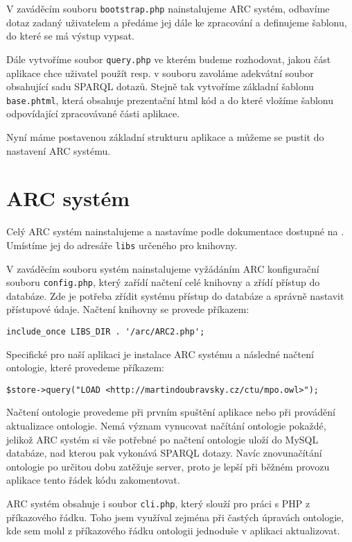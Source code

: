 V zaváděcím souboru \verb|bootstrap.php| nainstalujeme ARC systém, odbavíme dotaz zadaný uživatelem a předáme jej dále ke zpracování a definujeme šablonu, do které se má výstup vypsat.

Dále vytvoříme soubor \verb|query.php| ve kterém budeme rozhodovat, jakou část aplikace chce uživatel použít resp. v souboru zavoláme adekvátní soubor obsahující sadu SPARQL dotazů.
Stejně tak vytvoříme základní šablonu \verb|base.phtml|, která obsahuje prezentační html kód a do které vložíme šablonu odpovídající zpracovávané části aplikace. 


Nyní máme postavenou základní strukturu aplikace a můžeme se pustit do nastavení ARC systému.


\section{ARC systém}

Celý ARC systém nainstalujeme a nastavíme podle dokumentace dostupné na \cite{arc}.
Umístíme jej do adresáře \verb|libs| určeného pro knihovny.

V zaváděcím souboru systém nainstalujeme vyžádáním ARC konfigurační souboru \verb|config.php|, který zařídí načtení celé knihovny a zřídí přístup do databáze. 
Zde je potřeba zřídit systému přístup do databáze a správně nastavit přístupové údaje. Načtení knihovny se provede příkazem:

\begin{verbatim}
include_once LIBS_DIR . '/arc/ARC2.php';
\end{verbatim}

Specifické pro naší aplikaci je instalace ARC systému a následné načtení ontologie, které provedeme příkazem:

\begin{verbatim}
$store->query("LOAD <http://martindoubravsky.cz/ctu/mpo.owl>"); 
\end{verbatim}

Načtení ontologie provedeme při prvním spuštění aplikace nebo při provádění aktualizace ontologie. Nemá význam vynucovat načítání ontologie pokaždé, jelikož ARC systém si vše potřebné po načtení ontologie uloží do MySQL databáze, nad kterou pak vykonává SPARQL dotazy.
Navíc znovunačítání ontologie po určitou dobu zatěžuje server, proto je lepší při běžném provozu aplikace tento řádek kódu zakomentovat.

ARC systém obsahuje i soubor \verb|cli.php|, který slouží pro práci s PHP z příkazového řádku. Toho jsem využíval zejména při častých úpravách ontologie, kde sem mohl z příkazového řádku ontologii jednoduše v aplikaci aktualizovat. 

